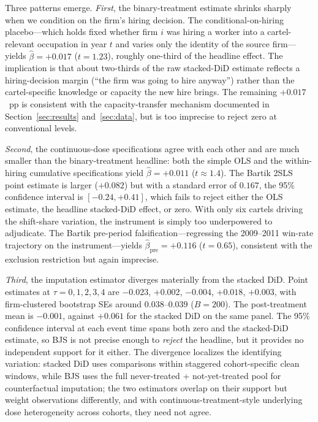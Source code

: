 Three patterns emerge. \emph{First}, the binary-treatment estimate shrinks sharply when we condition on the firm's hiring decision. The conditional-on-hiring placebo---which holds fixed whether firm $i$ was hiring a worker into a cartel-relevant occupation in year $t$ and varies only the identity of the source firm---yields $\hat\beta = +0.017$ ($t = 1.23$), roughly one-third of the headline effect. The implication is that about two-thirds of the raw stacked-DiD estimate reflects a hiring-decision margin (``the firm was going to hire anyway'') rather than the cartel-specific knowledge or capacity the new hire brings. The remaining $+0.017$~pp is consistent with the capacity-transfer mechanism documented in Section~\ref{sec:results} and~\ref{sec:data}, but is too imprecise to reject zero at conventional levels.

\emph{Second}, the continuous-dose specifications agree with each other and are much smaller than the binary-treatment headline: both the simple OLS and the within-hiring cumulative specifications yield $\hat\beta = +0.011$ ($t\approx 1.4$). The Bartik 2SLS point estimate is larger ($+0.082$) but with a standard error of $0.167$, the 95\% confidence interval is $[-0.24, +0.41]$, which fails to reject either the OLS estimate, the headline stacked-DiD effect, or zero. With only six cartels driving the shift-share variation, the instrument is simply too underpowered to adjudicate. The Bartik pre-period falsification---regressing the 2009--2011 win-rate trajectory on the instrument---yields $\hat\beta_{\text{pre}} = +0.116$ ($t = 0.65$), consistent with the exclusion restriction but again imprecise.

\emph{Third}, the \citet{borusyak2024revisiting} imputation estimator diverges materially from the stacked DiD. Point estimates at $\tau = 0, 1, 2, 3, 4$ are $-0.023$, $+0.002$, $-0.004$, $+0.018$, $+0.003$, with firm-clustered bootstrap SEs around $0.038$--$0.039$ ($B = 200$). The post-treatment mean is $-0.001$, against $+0.061$ for the stacked DiD on the same panel. The 95\% confidence interval at each event time spans both zero and the stacked-DiD estimate, so BJS is not precise enough to \emph{reject} the headline, but it provides no independent support for it either. The divergence localizes the identifying variation: stacked DiD uses comparisons within staggered cohort-specific clean windows, while BJS uses the full never-treated + not-yet-treated pool for counterfactual imputation; the two estimators overlap on their support but weight observations differently, and with continuous-treatment-style underlying dose heterogeneity across cohorts, they need not agree.

